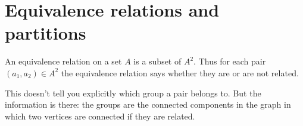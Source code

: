 \section{Equivalence relations and partitions}
An equivalence relation on a set $A$ is a subset of $A^2$. Thus for each pair
$(a_1, a_2) \in A^2$ the equivalence relation says whether they are or are
not related.

This doesn't tell you explicitly which group a pair belongs to. But the
information is there: the groups are the connected components in the graph in
which two vertices are connected if they are related.
